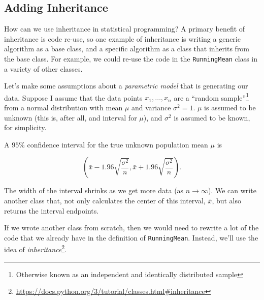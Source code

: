 \documentclass[
  12pt,
  krantz2]{krantz}
\renewcommand{\href}[2]{#2\footnote{\url{#1}}}
\begin{document}
\hypertarget{adding-inheritance}{%
\subsection{Adding Inheritance}\label{adding-inheritance}}

How can we use inheritance in statistical programming? A primary benefit of inheritance is code re-use, so one example of inheritance is writing a generic algorithm as a base class, and a specific algorithm as a class that inherits from the base class. For example, we could re-use the code in the \texttt{RunningMean} class in a variety of other classes.

Let's make some assumptions about a \emph{parametric model} that is generating our data. Suppose I assume that the data points \(x_1, \ldots, x_n\) are a ``random sample''\footnote{Otherwise known as an independent and identically distributed sample} from a normal distribution with mean \(\mu\) and variance \(\sigma^2=1\). \(\mu\) is assumed to be unknown (this is, after all, and interval for \(\mu\)), and \(\sigma^2\) is assumed to be known, for simplicity.

A \(95\%\) confidence interval for the true unknown population mean \(\mu\) is

\begin{equation} 
\left( \bar{x} - 1.96 \sqrt{\frac{\sigma^2}{n}}, \bar{x} + 1.96 \sqrt{\frac{\sigma^2}{n}} \right).
\end{equation}

The width of the interval shrinks as we get more data (as \(n \to \infty\)). We can write another class that, not only calculates the center of this interval, \(\bar{x}\), but also returns the interval endpoints.

If we wrote another class from scratch, then we would need to rewrite a lot of the code that we already have in the definition of \texttt{RunningMean}. Instead, we'll use the idea of \href{https://docs.python.org/3/tutorial/classes.html\#inheritance}{\emph{inheritance}}.
\end{document}

